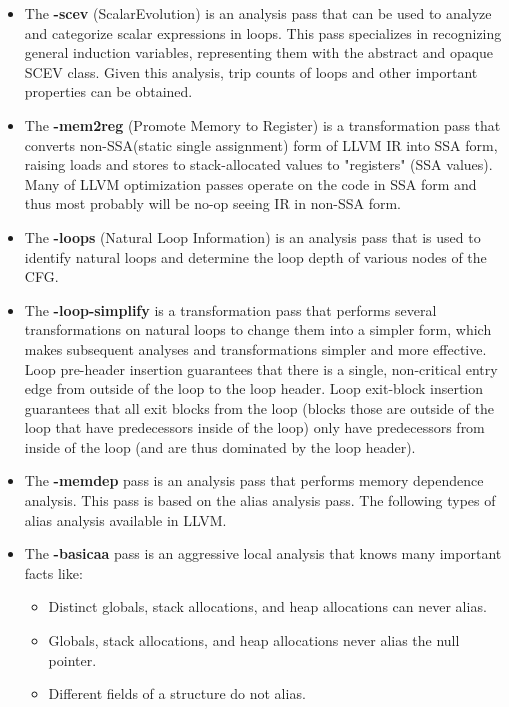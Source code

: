 \documentclass[10pt]{report}          %
\begin{document}
\begin{enumerate}
\begin{itemize}
\item The \textbf{-scev} (ScalarEvolution) is an analysis pass that can be used to analyze and categorize scalar expressions in loops.  This pass specializes in recognizing general induction variables, representing them with the abstract and opaque
SCEV class.  Given this analysis, trip counts of loops and other important properties can be obtained. \\
\item The \textbf{-mem2reg} (Promote Memory to Register) is a transformation pass that converts non-SSA(static single assignment) form of LLVM IR into SSA form, raising loads and stores to stack-allocated values to "registers" (SSA values). Many of LLVM optimization passes operate on the code in SSA form and thus most probably will be no-op seeing IR in non-SSA form.\\
\item The \textbf{-loops} (Natural Loop Information) is an analysis pass that is used to identify natural loops and determine the loop depth of various nodes of the CFG.\\
\item The \textbf{-loop-simplify} is a transformation pass that performs several transformations on natural loops to change them into a simpler form, which makes subsequent analyses and transformations simpler and more effective. Loop pre-header insertion guarantees that there is a single, non-critical entry edge from outside of the loop to the loop header.  Loop exit-block insertion guarantees that all exit blocks from the loop (blocks those are outside of the loop that have predecessors inside of the loop) only have predecessors from inside of the loop (and are thus dominated by the loop header). \\
\item The \textbf{-memdep} pass is an analysis pass that performs memory dependence analysis.  This pass is based on the alias analysis pass.  The following types of alias analysis available in LLVM.
\item The \textbf{-basicaa} pass is an aggressive local analysis that knows many important facts like:
\begin{itemize}
\item Distinct globals, stack allocations, and heap allocations can never alias.
\item Globals, stack allocations, and heap allocations never alias the null pointer.
\item Different fields of a structure do not alias.

\end{itemize}
\end{itemize}
\end{enumerate}
\end{document}

